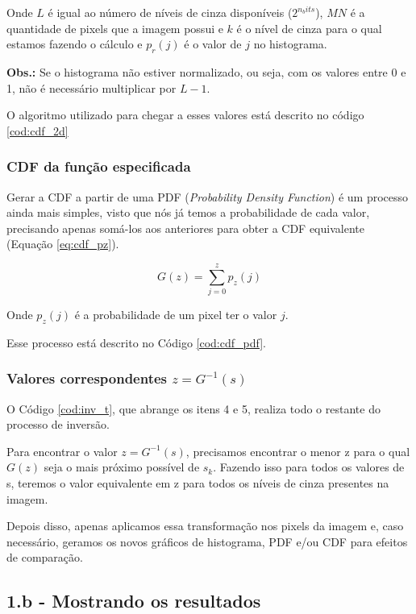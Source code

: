 \documentclass{article}
\begin{document}
Onde $L$ é igual ao número de níveis de cinza disponíveis ($2^{n_bits}$), $MN$ é a quantidade de pixels que a imagem possui e $k$ é o nível de cinza para o qual estamos fazendo o cálculo e $p_r(j)$ é o valor de $j$ no histograma. 

\textbf{Obs.:} Se o histograma não estiver normalizado, ou seja, com os valores entre 0 e 1, não é necessário multiplicar por $L - 1$.

O algoritmo utilizado para chegar a esses valores está descrito no código \ref{cod:cdf_2d}

\subsubsection*{CDF da função especificada}
Gerar a CDF a partir de uma PDF (\textit{Probability Density Function}) é um processo ainda mais simples, visto que nós já temos a probabilidade de cada valor, precisando apenas somá-los aos anteriores para obter a CDF equivalente (Equação \ref{eq:cdf_pz}).


\begin{equation}
	\label{eq:cdf_pz}
	G(z) = \sum_{j = 0}^{z} p_z(j)
\end{equation}

Onde $p_z(j)$ é a probabilidade de um pixel ter o valor $j$.

Esse processo está descrito no Código \ref{cod:cdf_pdf}.

\subsubsection*{Valores correspondentes $z = G^{-1}(s)$}

O Código \ref{cod:inv_t}, que abrange os itens 4 e 5, realiza todo o restante do processo de inversão. 

Para encontrar o valor $z = G^{-1}(s)$, precisamos encontrar o menor z para o qual $G(z)$ seja o mais próximo possível de $s_k$.
Fazendo isso para todos os valores de s, teremos o valor equivalente em z para todos os níveis de cinza presentes na imagem.

Depois disso, apenas aplicamos essa transformação nos pixels da imagem e, caso necessário, geramos os novos gráficos de histograma, PDF e/ou CDF para efeitos de comparação.

\subsection*{1.b - Mostrando os resultados}
\end{document}
